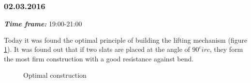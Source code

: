 \subsubsection{02.03.2016}
\textit{\textbf{Time frame:}} 19:00-21:00 

Today it was found the optimal principle of building the lifting mechanism (figure \ref{Elevator4.5}). It was found out that if two slats are placed at the angle of $90^circ$, they form the most firm construction with a good resistance against bend.

\begin{figure}[H]
	\begin{minipage}[h]{1\linewidth}
		\caption{Optimal construction}
		\label{Elevator4.5}
	\end{minipage}
\end{figure}

